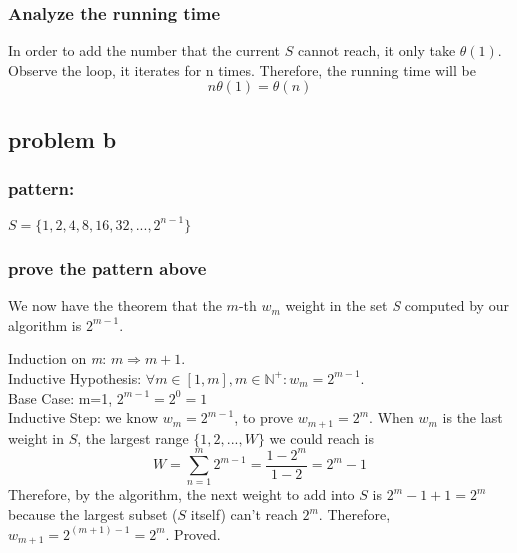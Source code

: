 \documentclass{article}
\begin{document}
        \subsubsection{Analyze the running time}
            In order to add the number that the current $S$ cannot reach, it only take $\theta(1)$. Observe the loop, it iterates for n times. Therefore, the running time will be
            \[n\theta(1)=\theta(n)\]
            
        \subsection{problem b}
        \subsubsection{pattern:}
            $S = \{1, 2, 4, 8, 16, 32, ..., 2^{n-1}\}$
        \subsubsection{prove the pattern above}
            We now have the theorem that the $m$-th $w_m$ weight in the set \textit{S} computed by our algorithm is $2^{m-1}$. 
            
            Induction on \textit{m}: $m\Rightarrow m+1$.\\
              Inductive Hypothesis: $\forall m\in [1,m], m\in \mathbb{N}^{+}: w_m = 2^{m-1}$.\\
            Base Case: m=1, $2^{m-1}=2^0=1$\\
            Inductive Step: we know $w_m=2^{m-1}$, to prove $w_{m+1}=2^{m}$. When $w_m$ is the last weight in $S$, the largest range $\{1,2,...,W\}$ we could reach is 
    \[ W = \sum_{n=1}^{m} 2^{m-1} = \frac{1-2^m}{1-2}=2^m-1 \]
            Therefore, by the algorithm, the next weight to add into $S$ is $2^m-1+1=2^m$ because the largest subset ($S$ itself) can't reach $2^m$. Therefore, $w_{m+1}=2^{(m+1)-1}=2^m$. Proved.
            
        
        
\end{document}
